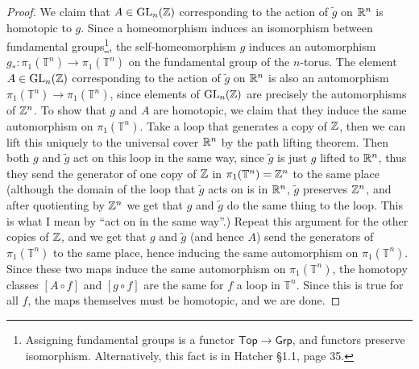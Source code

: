 \begin{proof}
    We claim that $A\in \operatorname{GL}_n (\mathbb{Z})$ corresponding to the action of $\widetilde g$ on $\mathbb{R}^n $ is homotopic to $g$.
    Since a homeomorphism induces an isomorphism between fundamental groups\footnote{Assigning fundamental groups is a functor $\mathsf{Top} \to \mathsf{Grp} $, and functors preserve isomorphism. Alternatively, this fact is in Hatcher \S 1.1, page 35.}, the self-homeomorphism $g$ induces an automorphism $g_* \colon \pi_1(\mathbb{T}^n )\to \pi_1(\mathbb{T}^n )$ on the fundamental group of the $n$-torus. The element $A\in \operatorname{GL}_n (\mathbb{Z})$ corresponding to the action of $\widetilde g$ on $\mathbb{R}^n $ is also an automorphism $\pi_1(\mathbb{T}^n )\to \pi_1(\mathbb{T}^n )$, since elements of $\operatorname{GL}_n (\mathbb{Z})$ are precisely the automorphisms of $\mathbb{Z}^n $. To show that $g$ and $A$ are homotopic, we claim that they induce the same automorphism on $\pi_1(\mathbb{T}^n )$. Take a loop that generates a copy of $\mathbb{Z}$, then we can lift this uniquely to the universal cover $\mathbb{R}^n $ by the path lifting theorem. Then both $g$ and $\widetilde g$ act on this loop in the same way, since $\widetilde g$ is just $g$ lifted to $\mathbb{R}^n $, thus they send the generator of one copy of $\mathbb{Z}$ in $\pi_1(\mathbb{T}^n )=\mathbb{Z}^n $ to the same place (although the domain of the loop that $\widetilde g$ acts on is in $\mathbb{R}^n $, $\widetilde g$ preserves $\mathbb{Z}^n $, and after quotienting by $\mathbb{Z}^n $ we get that $g$ and $\widetilde g$ do the same thing to the loop. This is what I mean by ``act on in the same way''.) Repeat this argument for the other copies of $\mathbb{Z}$, and we get that $g$ and $\widetilde g$ (and hence $A$) send the generators of $\pi_1(\mathbb{T}^n )$ to the same place, hence inducing the same automorphism on $\pi_1(\mathbb{T}^n )$. Since these two maps induce the same automorphism on $\pi_1(\mathbb{T}^n )$, the homotopy classes $[A \circ f]$ and $[g \circ f]$ are the same for $f$ a loop in $\mathbb{T}^n $. Since this is true for all $f$, the maps themselves must be homotopic, and we are done.
\end{proof}


